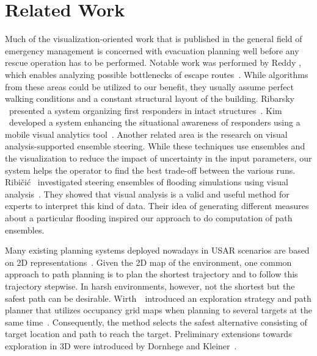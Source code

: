 \section{Related Work} \label{sec:relatedwork}
 Much of the visualization-oriented work that is published in the general field of emergency management is concerned with evacuation planning well before any rescue operation has to be performed. Notable work was performed by Reddy \etal, which enables analyzing possible bottlenecks of escape routes~\cite{EuroVA12:13-17:2012}. While algorithms from these areas could be utilized to our benefit, they usually assume perfect walking conditions and a constant structural layout of the building. Ribarsky \etal\ presented a system organizing first responders in intact structures~\cite{Ribarsky:2010}. Kim \etal\ developed a system enhancing the situational awareness of responders using a mobile visual analytics tool~\cite{Kim:2008}. Another related area is the research on visual analysis-supported ensemble steering. While these techniques use ensembles and the visualization to reduce the impact of uncertainty in the input parameters, our system helps the operator to find the best trade-off between the various runs. Ribi\v{c}i\'c \etal\ investigated steering ensembles of flooding simulations using visual analysis~\cite{6280550}. They showed that visual analysis is a valid and useful method for experts to interpret this kind of data. Their idea of generating different measures about a particular flooding inspired our approach to do computation of path ensembles. 

Many existing planning systems deployed nowadays in USAR scenarios are based on 2D representations~\cite{kleiner_et_al_ssrr09,KohlbrecherMeyerStrykKlingaufFlexibleSlamSystem2011,Pellenz2009SMU}. Given the 2D map of the environment, one common approach to path planning is to plan the shortest trajectory and to follow this trajectory stepwise. In harsh environments, however, not the shortest but the safest path can be desirable. Wirth~\etal\ introduced an exploration strategy and path planner that utilizes occupancy grid maps when planning to several targets at the same time~\cite{Wirth2007ETA1}. Consequently, the method selects the safest alternative consisting of target location and path to reach the target. Preliminary extensions towards exploration in 3D were introduced by Dornhege and Kleiner~\cite{dornhege2011frontier}.


